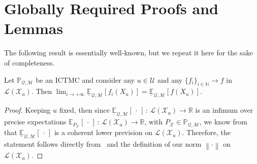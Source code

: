 \documentclass[twoside,11pt]{article}
\newcommand{\nats}{\mathbb{N}}
\newcommand{\reals}{\mathbb{R}}
\newcommand{\states}{\mathcal{X}}
\newcommand{\lexp}{\underline{\mathbb{E}}_{\rateset,\mathcal{M}}}
\newcommand{\gambles}{\mathcal{L}}
\newcommand{\rateset}{\mathcal{Q}}
\newcommand{\norm}[1]{\left\lVert #1 \right\rVert}
\newcommand{\abs}[1]{\left\vert #1 \right\vert}
\newcommand{\coloneqq}{:\!=}
\begin{document}
\section{Globally Required Proofs and Lemmas}

The following result is essentially well-known, but we repeat it here for the sake of completeness.

\begin{lemma}\label{lemma:limit_lexp_is_lexp_limit}
Let $\mathbb{P}_{\rateset,\mathcal{M}}$ be an ICTMC and consider any $u\in\mathcal{U}$ and any $\{f_i\}_{i\in\nats}\to f$ in $\gambles(\states_u)$. Then $\lim_{i\to+\infty}\lexp[f_i(X_u)]=\lexp[f(X_u)]$.
\end{lemma}
\begin{proof}
Keeping $u$ fixed, then since $\lexp[\,\cdot\,]\,:\,\gambles(\states_u)\to\reals$ is an infimum over precise expectations $\mathbb{E}_{P_\states}[\,\cdot\,]\,:\,\gambles(\states_u)\to\reals$, with $P_\states\in\mathbb{P}_{\rateset,\mathcal{M}}$, we know from~\cite[Theorem 3.3.3]{Walley:1991vk} that $\lexp[\,\cdot\,]$ is a coherent lower prevision on $\gambles(\states_u)$. Therefore, the statement follows directly from~\cite[Proposition 2.6.1.$\ell$]{Walley:1991vk} and the definition of our norm $\norm{\cdot}$ on $\gambles(\states_u)$.
\end{proof}
%
%
\end{document}
